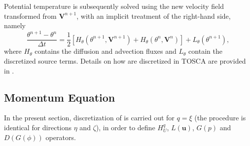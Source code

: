 Potential temperature is subsequently solved using the new velocity field transformed from $\mathbf{V}^{n+1}$, with an implicit treatment of the right-hand side, namely
\begin{equation}
	\frac{\theta^{n+1} - \theta^{n}}{\Delta t} = \frac{1}{2}\left[H_\theta(\theta^{n+1},\mathbf{V}^{n+1}) + H_\theta(\theta^{n},\mathbf{V}^{n})\right] + L_\theta(\theta^{n+1}), \label{eq:spatialDiscrTemperature}
\end{equation}
where $H_\theta$ contains the diffusion and advection fluxes and $L_\theta$ contain the discretized source terms. 
Details on how  are discretized in TOSCA are provided in .

\subsection{Momentum Equation}
\label{subsec:momentumDiscretization}
In the present section, discretization of  is carried out for $q=\xi$ (the procedure is identical for directions $\eta$ and $\zeta$), in order to define $H^q_U$, $L(\mathbf{u})$, $G(p)$ and $D\left(G(\phi)\right)$ operators. 

